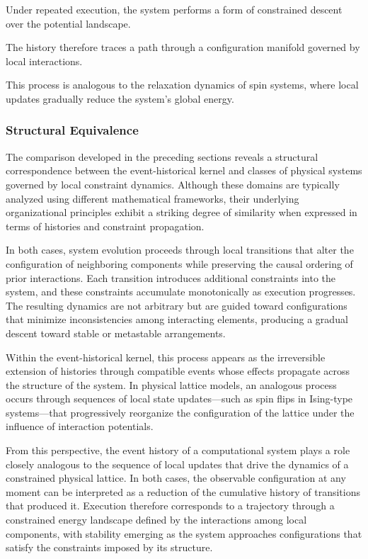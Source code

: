 \documentclass[12pt]{article}
\begin{document}
Under repeated execution, the system performs a form
of constrained descent over the potential landscape.

The history therefore traces a path through a
configuration manifold governed by local interactions.

This process is analogous to the relaxation dynamics
of spin systems, where local updates gradually
reduce the system's global energy.
\subsubsection{Structural Equivalence}

The comparison developed in the preceding sections
reveals a structural correspondence between the
event-historical kernel and classes of physical
systems governed by local constraint dynamics.
Although these domains are typically analyzed using
different mathematical frameworks, their underlying
organizational principles exhibit a striking degree
of similarity when expressed in terms of histories
and constraint propagation.

In both cases, system evolution proceeds through
local transitions that alter the configuration of
neighboring components while preserving the causal
ordering of prior interactions. Each transition
introduces additional constraints into the system,
and these constraints accumulate monotonically as
execution progresses. The resulting dynamics are not
arbitrary but are guided toward configurations that
minimize inconsistencies among interacting elements,
producing a gradual descent toward stable or
metastable arrangements.

Within the event-historical kernel, this process
appears as the irreversible extension of histories
through compatible events whose effects propagate
across the structure of the system. In physical
lattice models, an analogous process occurs through
sequences of local state updates—such as spin flips
in Ising-type systems—that progressively reorganize
the configuration of the lattice under the influence
of interaction potentials.

From this perspective, the event history of a
computational system plays a role closely analogous
to the sequence of local updates that drive the
dynamics of a constrained physical lattice. In both
cases, the observable configuration at any moment
can be interpreted as a reduction of the cumulative
history of transitions that produced it. Execution
therefore corresponds to a trajectory through a
constrained energy landscape defined by the
interactions among local components, with stability
emerging as the system approaches configurations
that satisfy the constraints imposed by its
structure.
\end{document}
